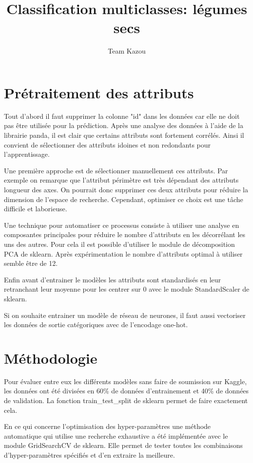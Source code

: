 \documentclass[12pt]{article}
\title{Classification multiclasses: légumes secs}
\author{Team Kazou}
\date{\vspace{-5ex}}
\begin{document}
\maketitle

\section*{Prétraitement des attributs}

Tout d'abord il faut supprimer la colonne "id" dans les données car elle ne doit pas être utilisée pour la prédiction. Après une analyse des données à l'aide de la librairie panda, il est clair que certains attributs sont fortement corrélés. Ainsi il convient de sélectionner des attributs idoines et non redondants pour l'apprentissage. 

Une première approche est de sélectionner manuellement ces attributs. Par exemple on remarque que l'attribut périmètre est très dépendant des attributs longueur des axes. On pourrait donc supprimer ces deux attributs pour réduire la dimension de l'espace de recherche. Cependant, optimiser ce choix est une tâche difficile et laborieuse. 

Une technique pour automatiser ce processus consiste à utiliser une analyse en composantes principales pour réduire le nombre d'attributs en les décorrélant les uns des autres. Pour cela il est possible d'utiliser le module de décomposition PCA de sklearn. Après expérimentation le nombre d'attributs optimal à utiliser semble être de 12. 

Enfin avant d'entrainer le modèles les attributs sont standardisés en leur retranchant leur moyenne pour les centrer sur 0 avec le module StandardScaler de sklearn.

Si on souhaite entrainer un modèle de réseau de neurones, il faut aussi vectoriser les données de sortie catégoriques avec de l'encodage one-hot.

\section*{Méthodologie}

Pour évaluer entre eux les différents modèles sans faire de soumission sur Kaggle, les données ont été divisées en 60\% de données d'entrainement et 40\% de données de validation. La fonction train\_test\_split de sklearn permet de faire exactement cela.

En ce qui concerne l'optimisation des hyper-paramètres une méthode automatique qui utilise une recherche exhaustive a été implémentée avec le module GridSearchCV de sklearn. Elle permet de tester toutes les combinaisons d'hyper-paramètres spécifiés et d'en extraire la meilleure. 
\end{document}
